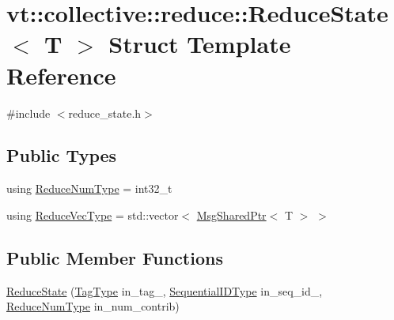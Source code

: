 \hypertarget{structvt_1_1collective_1_1reduce_1_1_reduce_state}{}\section{vt\+:\+:collective\+:\+:reduce\+:\+:Reduce\+State$<$ T $>$ Struct Template Reference}
\label{structvt_1_1collective_1_1reduce_1_1_reduce_state}


{\ttfamily \#include $<$reduce\+\_\+state.\+h$>$}

\subsection*{Public Types}
\begin{DoxyCompactItemize}
\item 
using \hyperlink{structvt_1_1collective_1_1reduce_1_1_reduce_state_adda7ff0ae58325a43a0a8bad447a8bfb}{Reduce\+Num\+Type} = int32\+\_\+t
\item 
using \hyperlink{structvt_1_1collective_1_1reduce_1_1_reduce_state_a2336f24c27986fdf5131a3a19bf75107}{Reduce\+Vec\+Type} = std\+::vector$<$ \hyperlink{namespacevt_ab2b3d506ec8e8d1540aede826d84a239}{Msg\+Shared\+Ptr}$<$ T $>$ $>$
\end{DoxyCompactItemize}
\subsection*{Public Member Functions}
\begin{DoxyCompactItemize}
\item 
\hyperlink{structvt_1_1collective_1_1reduce_1_1_reduce_state_aab33d1a9b78e1663ff14497d2b64829c}{Reduce\+State} (\hyperlink{namespacevt_a84ab281dae04a52a4b243d6bf62d0e52}{Tag\+Type} in\+\_\+tag\+\_\+, \hyperlink{namespacevt_a3063d4db3b879d6dd2c7b8d50995c7f6}{Sequential\+I\+D\+Type} in\+\_\+seq\+\_\+id\+\_\+, \hyperlink{structvt_1_1collective_1_1reduce_1_1_reduce_state_adda7ff0ae58325a43a0a8bad447a8bfb}{Reduce\+Num\+Type} in\+\_\+num\+\_\+contrib)
\end{DoxyCompactItemize}
